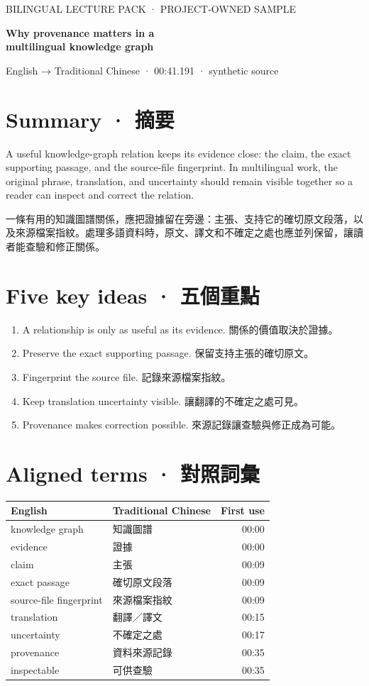 \documentclass[10pt]{article}
\begin{document}
{\sffamily\small\color{green} BILINGUAL LECTURE PACK · PROJECT-OWNED SAMPLE}

{\LARGE\bfseries\color{ink} Why provenance matters in a\\multilingual knowledge graph}

{\small English → Traditional Chinese · 00:41.191 · synthetic source}

\section*{Summary · 摘要}
A useful knowledge-graph relation keeps its evidence close: the claim, the exact supporting passage, and the source-file fingerprint. In multilingual work, the original phrase, translation, and uncertainty should remain visible together so a reader can inspect and correct the relation.

一條有用的知識圖譜關係，應把證據留在旁邊：主張、支持它的確切原文段落，以及來源檔案指紋。處理多語資料時，原文、譯文和不確定之處也應並列保留，讓讀者能查驗和修正關係。

\section*{Five key ideas · 五個重點}
\begin{enumerate}
  \item A relationship is only as useful as its evidence. \hfill 關係的價值取決於證據。
  \item Preserve the exact supporting passage. \hfill 保留支持主張的確切原文。
  \item Fingerprint the source file. \hfill 記錄來源檔案指紋。
  \item Keep translation uncertainty visible. \hfill 讓翻譯的不確定之處可見。
  \item Provenance makes correction possible. \hfill 來源記錄讓查驗與修正成為可能。
\end{enumerate}

\section*{Aligned terms · 對照詞彙}
\small
\begin{tabularx}{\textwidth}{@{}lXr@{}}
\toprule
English & Traditional Chinese & First use \\
\midrule
knowledge graph & 知識圖譜 & 00:00 \\
evidence & 證據 & 00:00 \\
claim & 主張 & 00:09 \\
exact passage & 確切原文段落 & 00:09 \\
source-file fingerprint & 來源檔案指紋 & 00:09 \\
translation & 翻譯／譯文 & 00:15 \\
uncertainty & 不確定之處 & 00:17 \\
provenance & 資料來源記錄 & 00:35 \\
inspectable & 可供查驗 & 00:35 \\
\bottomrule
\end{tabularx}
\end{document}
